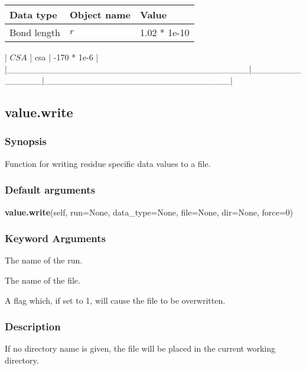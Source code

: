 \begin{center}
\begin{tabular}{lll}
\toprule
Data type & Object name & Value \\
\midrule
Bond length & $r$ & 1.02 * 1e-10 \\
\bottomrule
\end{tabular}
\end{center}

| $CSA$                                   | csa          | -170 * 1e-6                  |
|\_\_\_\_\_\_\_\_\_\_\_\_\_\_\_\_\_\_\_\_\_\_\_\_\_\_\_\_\_\_\_\_\_\_\_\_\_\_\_|\_\_\_\_\_\_\_\_\_\_\_\_\_\_|\_\_\_\_\_\_\_\_\_\_\_\_\_\_\_\_\_\_\_\_\_\_\_\_\_\_\_\_\_\_|


\newpage

\subsection{value.write}


\subsubsection{Synopsis}

Function for writing residue specific data values to a file.

\subsubsection{Default arguments}

\textsf{\textbf{value.write}(self, run=None, data\_type=None, file=None, dir=None, force=0)}


\subsubsection{Keyword Arguments}

  The name of the run.

  The name of the file.

  A flag which, if set to 1, will cause the file to be overwritten.

\subsubsection{Description}

If no directory name is given, the file will be placed in the current working directory.

